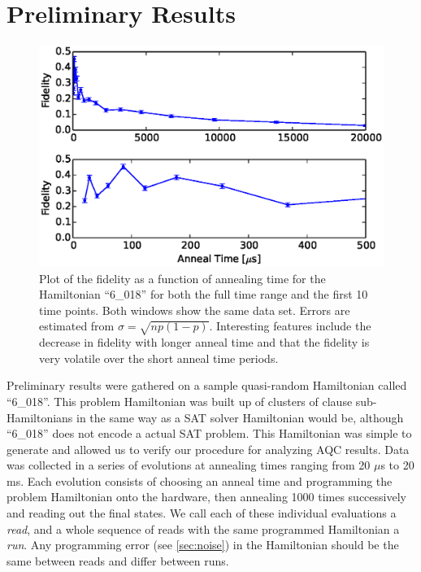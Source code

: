 \chapter{Preliminary Results}
\label{chap:prelim}

\begin{figure}[h]
	\includegraphics{img/6_018_2_fidelity.eps}
	\caption[Fidelity vs Time]{Plot of the fidelity as a function of annealing time for the Hamiltonian ``6\_018'' for both the full time range and the first 10 time points.  Both windows show the same data set.  Errors are estimated from $\sigma = \sqrt{np(1-p)}$.  Interesting features include the decrease in fidelity with longer anneal time and that the fidelity is very volatile over the short anneal time periods.}
	\label{fig:fidelity}
\end{figure}

Preliminary results were gathered on a sample quasi-random Hamiltonian called ``6\_018''.  This problem Hamiltonian was built up of clusters of clause sub-Hamiltonians in the same way as a SAT solver Hamiltonian would be, although ``6\_018'' does not encode a actual SAT problem.  This Hamiltonian was simple to generate and allowed us to verify our procedure for analyzing AQC results.
Data was collected in a series of evolutions at annealing times ranging from 20 $\mu$s to 20 ms.  Each evolution consists of choosing an anneal time and programming the problem Hamiltonian onto the hardware, then annealing 1000 times successively and reading out the final states.  We call each of these individual evaluations a \emph{read}, and a whole sequence of reads with the same programmed Hamiltonian a \emph{run}.  Any programming error (see \ref{sec:noise}) in the Hamiltonian should be the same between reads and differ between runs.

